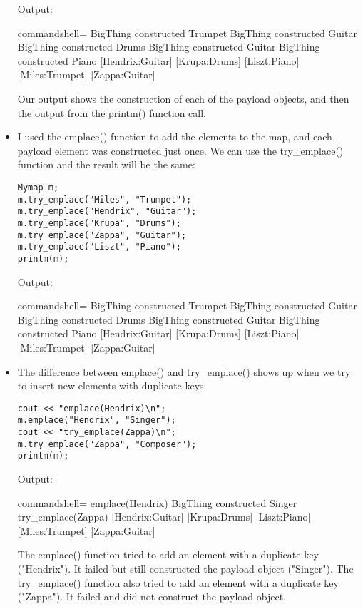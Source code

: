 \begin{itemize}
Output:

\begin{tcblisting}{commandshell={}}
BigThing constructed Trumpet
BigThing constructed Guitar
BigThing constructed Drums
BigThing constructed Guitar
BigThing constructed Piano
[Hendrix:Guitar] [Krupa:Drums] [Liszt:Piano]
[Miles:Trumpet] [Zappa:Guitar]
\end{tcblisting}

Our output shows the construction of each of the payload objects, and then the output from the printm() function call.

\item 
I used the emplace() function to add the elements to the map, and each payload element was constructed just once. We can use the try\_emplace() function and the result will be the same:

\begin{lstlisting}[style=styleCXX]
Mymap m;
m.try_emplace("Miles", "Trumpet");
m.try_emplace("Hendrix", "Guitar");
m.try_emplace("Krupa", "Drums");
m.try_emplace("Zappa", "Guitar");
m.try_emplace("Liszt", "Piano");
printm(m);
\end{lstlisting}

Output:

\begin{tcblisting}{commandshell={}}
BigThing constructed Trumpet
BigThing constructed Guitar
BigThing constructed Drums
BigThing constructed Guitar
BigThing constructed Piano
[Hendrix:Guitar] [Krupa:Drums] [Liszt:Piano]
[Miles:Trumpet] [Zappa:Guitar]
\end{tcblisting}

\item 
The difference between emplace() and try\_emplace() shows up when we try to insert new elements with duplicate keys:

\begin{lstlisting}[style=styleCXX]
cout << "emplace(Hendrix)\n";
m.emplace("Hendrix", "Singer");
cout << "try_emplace(Zappa)\n";
m.try_emplace("Zappa", "Composer");
printm(m);
\end{lstlisting}

Output:

\begin{tcblisting}{commandshell={}}
emplace(Hendrix)
BigThing constructed Singer
try_emplace(Zappa)
[Hendrix:Guitar] [Krupa:Drums] [Liszt:Piano]
[Miles:Trumpet] [Zappa:Guitar]
\end{tcblisting}

The emplace() function tried to add an element with a duplicate key ("Hendrix"). It failed but still constructed the payload object ("Singer"). The try\_emplace() function also tried to add an element with a duplicate key ("Zappa"). It failed and did not construct the payload object.
\end{itemize}

